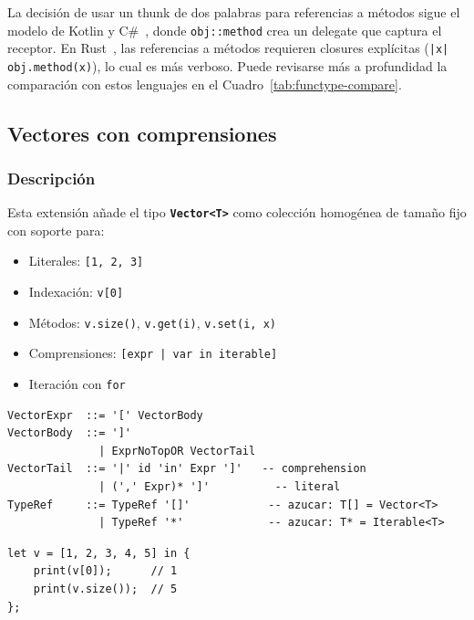 \documentclass[12pt, a4paper]{article}
\begin{document}
La decisión de usar un thunk de dos palabras para referencias a métodos sigue
el modelo de Kotlin y C\#~\cite{jemerov2017}, donde \texttt{obj::method} crea un delegate que
captura el receptor. En Rust~\cite{klabnik2019}, las referencias a métodos requieren closures
explícitas (\texttt{|x| obj.method(x)}), lo cual es más verboso. Puede revisarse más a profundidad la comparación con estos lenguajes en el Cuadro~\ref{tab:functype-compare}.

\newpage %

\subsection{Vectores con comprensiones}

\subsubsection{Descripción}

Esta extensión añade el tipo \textbf{\texttt{Vector<T>}} como colección
homogénea de tamaño fijo con soporte para:
\begin{itemize}
    \item Literales: \texttt{[1, 2, 3]}
    \item Indexación: \texttt{v[0]}
    \item Métodos: \texttt{v.size()}, \texttt{v.get(i)}, \texttt{v.set(i, x)}
    \item Comprensiones: \texttt{[expr | var in iterable]}
    \item Iteración con \texttt{for}
\end{itemize}

\begin{lstlisting}[language={},caption={Gramática BNF de vectores},
                   label=lst:vec-bnf]
VectorExpr  ::= '[' VectorBody
VectorBody  ::= ']'
              | ExprNoTopOR VectorTail
VectorTail  ::= '|' id 'in' Expr ']'   -- comprehension
              | (',' Expr)* ']'          -- literal
TypeRef     ::= TypeRef '[]'            -- azucar: T[] = Vector<T>
              | TypeRef '*'             -- azucar: T* = Iterable<T>
\end{lstlisting}

\begin{lstlisting}[caption={Literal de vector e indexación},
                   label=lst:vec-lit]
let v = [1, 2, 3, 4, 5] in {
    print(v[0]);      // 1
    print(v.size());  // 5
};
\end{lstlisting}
\end{document}
